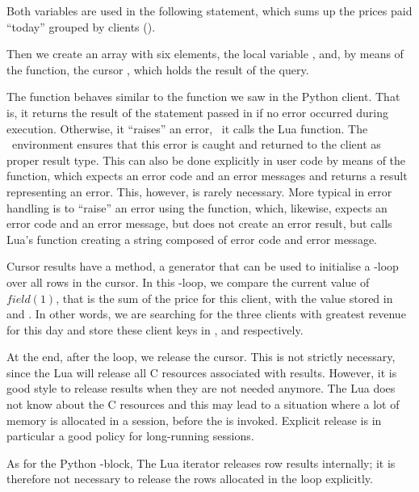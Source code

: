 Both variables are used in the following
 statement, which sums up the prices
paid ``today'' grouped by clients ().

Then we create an array with six elements, the local
variable , and, by means of the 
function, the cursor , which holds the result
of the query.

The function  behaves similar to
the  function we saw in the Python client.
That is, it returns the result of the statement passed in
if no error occurred during execution.
Otherwise, it ``raises'' an error, \ie\ it calls the Lua
 function.
The \nowdb\ environment ensures that this error is
caught and returned to the client as proper result type.
This can also be done explicitly in user code by means
of the  function, which expects an
error code and an error messages and returns a result
representing an error. This, however, is rarely necessary.
More typical in error handling is to ``raise'' an error
using the  function, which, likewise,
expects an error code and an error message, but does
not create an error result, but calls Lua's
 function creating a string composed
of error code and error message.

Cursor results have a  method,
a generator that can be used to initialise
a -loop over all rows in the cursor.
In this -loop, we compare the current
value of $field(1)$, that is the sum of the price
for this client, with the value stored in
 and . In other words,
we are searching for the three clients with
greatest revenue for this day and store these
client keys in ,  and
 respectively.

At the end, after the loop, we release the cursor.
This is not strictly necessary, since the Lua 
will release all C resources associated with results.
However, it is good style to release results when they
are not needed anymore. The Lua  does not
know about the C resources and this may lead to a situation
where a lot of memory is allocated in a session,
before the  is invoked.
Explicit release is in particular
a good policy for long-running sessions.

As for the Python -block,
The Lua iterator releases row results internally;
it is therefore not necessary to release
the rows allocated in the loop explicitly.

